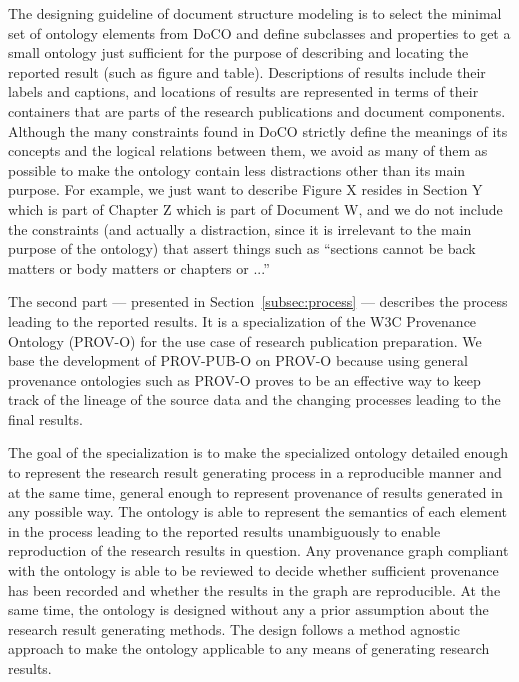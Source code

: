 The designing guideline of document structure modeling is to select the minimal set of ontology elements from DoCO and define subclasses and properties to get a small ontology just sufficient for the purpose of describing and locating the reported result (such as figure and table). Descriptions of results include their labels and captions, and locations of results are represented in terms of their containers that are parts of the research publications and document components. Although the many constraints found in DoCO strictly define the meanings of its concepts and the logical relations between them, we avoid as many of them as possible to make the ontology contain less distractions other than its main purpose. For example, we just want to describe Figure X resides in Section Y which is part of Chapter Z which is part of Document W, and we do not include the constraints (and actually a distraction, since it is irrelevant to the main purpose of the ontology) that assert things such as ``sections cannot be back matters or body matters or chapters or ...'' 

The second part --- presented in Section~\ref{subsec:process} --- describes the process leading to the reported results. It is a specialization of the W3C Provenance Ontology (PROV-O) for the use case of research publication preparation. We base the development of PROV-PUB-O on PROV-O because using general provenance ontologies such as PROV-O proves to be an effective way to keep track of the lineage of the source data and the changing processes leading to the final results. 

The goal of the specialization is to make the specialized ontology detailed enough to represent the research result generating process in a reproducible manner and at the same time, general enough to represent provenance of results generated in any possible way. The ontology is able to represent the semantics of each element in the process leading to the reported results unambiguously to enable reproduction of the research results in question. Any provenance graph compliant with the ontology is able to be reviewed to decide whether sufficient provenance has been recorded and whether the results in the graph are reproducible. At the same time, the ontology is designed without any a prior assumption about the research result generating methods. The design follows a method agnostic approach to make the ontology applicable to any means of generating research results.


